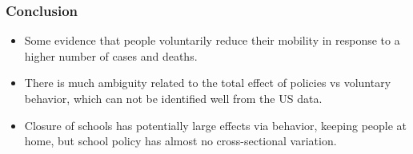 \documentclass{beamer}
\begin{document}

\begin{frame}
  \frametitle{Conclusion}
  
\begin{itemize}
  
 \item Some evidence that people voluntarily reduce their mobility in response to a higher number of cases and deaths.\smallskip

 
\item There is much ambiguity related to the total effect of policies vs voluntary behavior, which can not be identified well from the US data. \smallskip

\item Closure of schools has potentially large effects via behavior, keeping people at home, but school policy has almost no cross-sectional variation.\smallskip %


  
\end{itemize}
  
\end{frame}



\end{document}
